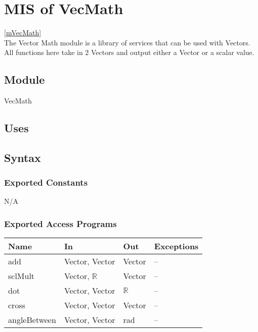 \documentclass[12pt, titlepage]{article}
\begin{document}

\newpage

\section{MIS of VecMath} \ref{mVecMath} \\
The Vector Math module is a library of services that can be used with Vectors. 
All functions here take in 2 Vectors and output either a Vector or a scalar 
value.

\subsection{Module}
VecMath

\subsection{Uses}

\subsection{Syntax}
\subsubsection{Exported Constants}
N/A
\subsubsection{Exported Access Programs}
\begin{center}
	\begin{tabular}{p{3cm} p{4cm} p{2cm} p{4cm}}
		\hline
		\textbf{Name} & \textbf{In} & \textbf{Out} & \textbf{Exceptions} \\
		\hline
		add & Vector, Vector & Vector & -- \\
		sclMult & Vector, $\mathbb{R}$ & Vector & -- \\ 
		dot & Vector, Vector & $\mathbb{R}$ & -- \\
		cross & Vector, Vector & Vector & -- \\
		angleBetween & Vector, Vector & rad & -- \\
		\hline
	\end{tabular}
\end{center}
\end{document}
